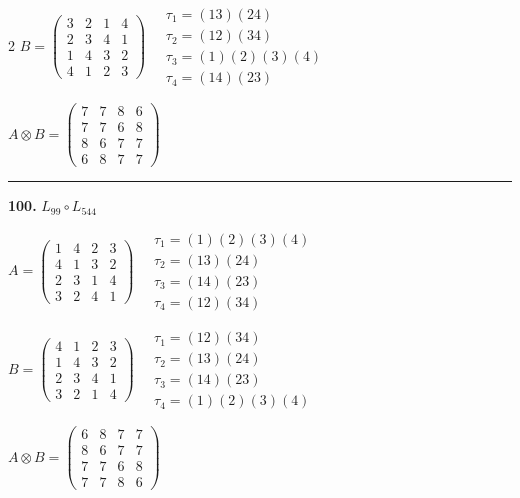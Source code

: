 \begin{multicols}{2}
$B = \begin{pmatrix} 3 & 2 & 1 & 4 \\ 2 & 3 & 4 & 1 \\ 1 & 4 & 3 & 2 \\ 4 & 1 & 2 & 3 \end{pmatrix} \quad \begin{matrix} \tau_{1}=(1 3)(2 4) \\ \tau_{2}=(1 2)(3 4) \\ \tau_{3}=(1)(2)(3)(4) \\ \tau_{4}=(1 4)(2 3) \end{matrix}$

$A \otimes B = \begin{pmatrix} 7 & 7 & 8 & 6 \\ 7 & 7 & 6 & 8 \\ 8 & 6 & 7 & 7 \\ 6 & 8 & 7 & 7 \end{pmatrix}$

\vspace{0.3em}
\hrule
\vspace{0.3em}

\noindent\textbf{100.} $L_{99} \circ L_{544}$

$A = \begin{pmatrix} 1 & 4 & 2 & 3 \\ 4 & 1 & 3 & 2 \\ 2 & 3 & 1 & 4 \\ 3 & 2 & 4 & 1 \end{pmatrix} \quad \begin{matrix} \tau_{1}=(1)(2)(3)(4) \\ \tau_{2}=(1 3)(2 4) \\ \tau_{3}=(1 4)(2 3) \\ \tau_{4}=(1 2)(3 4) \end{matrix}$

$B = \begin{pmatrix} 4 & 1 & 2 & 3 \\ 1 & 4 & 3 & 2 \\ 2 & 3 & 4 & 1 \\ 3 & 2 & 1 & 4 \end{pmatrix} \quad \begin{matrix} \tau_{1}=(1 2)(3 4) \\ \tau_{2}=(1 3)(2 4) \\ \tau_{3}=(1 4)(2 3) \\ \tau_{4}=(1)(2)(3)(4) \end{matrix}$

$A \otimes B = \begin{pmatrix} 6 & 8 & 7 & 7 \\ 8 & 6 & 7 & 7 \\ 7 & 7 & 6 & 8 \\ 7 & 7 & 8 & 6 \end{pmatrix}$


\end{multicols}
